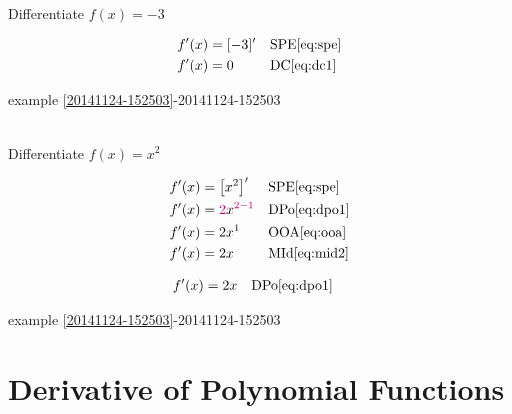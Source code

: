 \begin{example}[id:20141124-153017] \label{20141124-153017} \hfill \\

Differentiate $f(x)=-3$

\soln

\solnsteps
\begin{align*}
f'(x) &= [-3]' && \text{SPE} \eqref{eq:spe} \\
f'(x) &= 0 && \text{DC} \eqref{eq:dc1} 
\end{align*}

\qdepend

\qdependlist

example \ref{20141124-152503}-20141124-152503


\end{example}


\begin{example}[id:20141124-141850] \label{20141124-141850} \hfill \\

Differentiate $f(x)=x^2$

\soln

\solnsteps
\begin{align*}
f'(x) &= \left[x^2\right]' && \text{SPE} \eqref{eq:spe} \\
f'(x) &= \cRed{2}x^{\cRed{2-1}} && \text{DPo} \eqref{eq:dpo1} \\
f'(x) &= 2x^1 && \text{OOA} \eqref{eq:ooa} \\
f'(x) &= 2x && \text{MId} \eqref{eq:mid2} 
\end{align*}

\soln

\lesssteps
\begin{align*}
f'(x) & = 2x && \text{DPo} \eqref{eq:dpo1}  
\end{align*}

\qdepend

\qdependlist

example \ref{20141124-152503}-20141124-152503



\end{example}

\section{Derivative of Polynomial Functions}

